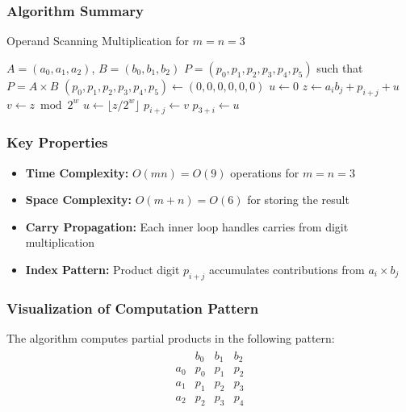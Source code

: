 \documentclass{article}
\begin{document}
\begin{enumerate}
\subsubsection*{Algorithm Summary}

\begin{algorithm*}
\caption{Operand Scanning Multiplication for $m = n = 3$}
\begin{algorithmic}[1]
\REQUIRE $A = (a_0, a_1, a_2)$, $B = (b_0, b_1, b_2)$
\ENSURE $P = (p_0, p_1, p_2, p_3, p_4, p_5)$ such that $P = A \times B$
\STATE $(p_0, p_1, p_2, p_3, p_4, p_5) \leftarrow (0, 0, 0, 0, 0, 0)$
    \STATE $u \leftarrow 0$
        \STATE $z \leftarrow a_i b_j + p_{i+j} + u$
        \STATE $v \leftarrow z \bmod 2^w$
        \STATE $u \leftarrow \lfloor z/2^w \rfloor$
        \STATE $p_{i+j} \leftarrow v$
    \ENDFOR
    \STATE $p_{3+i} \leftarrow u$
\ENDFOR
\end{algorithmic}
\end{algorithm*}

\subsubsection*{Key Properties}

\begin{itemize}
    \item \textbf{Time Complexity:} $O(mn) = O(9)$ operations for $m = n = 3$
    \item \textbf{Space Complexity:} $O(m+n) = O(6)$ for storing the result
    \item \textbf{Carry Propagation:} Each inner loop handles carries from digit multiplication
    \item \textbf{Index Pattern:} Product digit $p_{i+j}$ accumulates contributions from $a_i \times b_j$
\end{itemize}

\subsubsection*{Visualization of Computation Pattern}

The algorithm computes partial products in the following pattern:
\begin{align*}
\begin{array}{c|ccc}
    & b_0 & b_1 & b_2 \\
\hline
a_0 & p_0 & p_1 & p_2 \\
a_1 & p_1 & p_2 & p_3 \\
a_2 & p_2 & p_3 & p_4 \\
\end{array}
\end{align*}


\end{enumerate}
\end{document}
